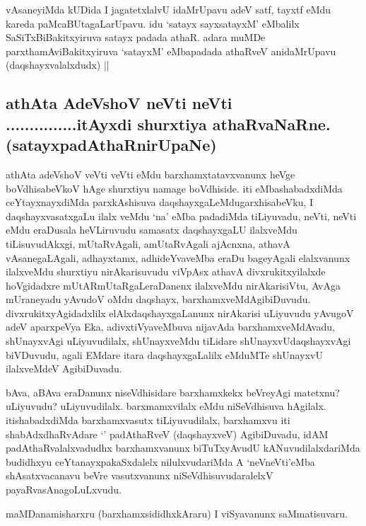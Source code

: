 \begin{artha}

vAsaneyiMda kUDida I jagatetxlalvU idaMrUpavu adeV satf, tayxtf eMdu
kareda paMcaBUtagaLarUpavu. idu `satayx sayxsatayxM' eMbalilx
SaSiTxBiBakitxyiruva satayx padada athaR. adara muMDe
parxthamAviBakitxyiruva `satayxM' eMbapadada athaRveV anidaMrUpavu
(daqshayxvalalxdudx) ||
\end{artha}

\begin{center}

\section*{athAta AdeVshoV neVti neVti ...............itAyxdi shurxtiya athaRvaNaRne.(satayxpadAthaRnirUpaNe)}

\bigskip


\end{center}

\begin{artha}
athAta adeVshoV veVti veVti eMdu barxhamxtatavxvanunx heVge
boVdhisabeVkoV hAge shurxtiyu namage boVdhiside. iti eMbashabadxdiMda
ceYtayxnayxdiMda parxkAshisuva daqshayxgaLeMdugarxhisabeVku, I
daqshayxvasatxgaLu ilalx veMdu `na' eMba padadiMda tiLiyuvadu, neVti,
neVti eMdu eraDusala heVLiruvudu samasatx daqshayxgaLU ilalxveMdu
tiLisuvudAkxgi, mUtaRvAgali, amUtaRvAgali ajAcnxna, athavA
vAsanegaLAgali, adhayxtamx, adhideYvaveMba eraDu bageyAgali
elalxvanunx ilalxveMdu shurxtiyu nirAkarisuvudu viVpAsx athavA
divxrukitxyilalxde hoVgidadxre mUtARmUtaRgaLeraDanenx ilalxveMdu
nirAkarisiVtu, AvAga mUraneyadu yAvudoV oMdu daqshayx,
barxhamxveMdAgibiDuvudu. divxrukitxyAgidadxlilx elAlxdaqshayxgaLanunx
nirAkarisi uLiyuvudu yAvugoV adeV aparxpeVya Eka, adivxtiVyaveMbuva
nijavAda barxhamxveMdAvadu, shUnayxvAgi uLiyuvudilalx, shUnayxveMdu
tiLidare shUnayxvUdaqshayxvAgi biVDuvudu, agali EMdare itara
daqshayxgaLalilx eMduMTe shUnayxvU ilalxveMdeV AgibiDuvadu.

bAva, aBAva eraDanunx niseVdhisidare barxhamxkekx beVreyAgi matetxnu?
uLiyuvudu? uLiyuvudilalx. barxmamxvilalx eMdu niSeVdhisuva
hAgilalx. itishabadxdiMda barxhamxvasutx tiLiyuvudilalx, barxhamxvu
iti shabAdxdhaRvAdare `\stext' padAthaRveV (daqshayxveV) AgibiDuvadu,
idAM padAthaRvalalxvadudhx barxhamxvanunx biTuTxyAvudU
kANuvudilalxdariMda budidhxyu ceYtanayxpakaSxdalelx nilulxvudariMda A
`neVneVti'eMba shAsatxvacanavu beVre vasutxvanunx
niSeVdhisuvudaralelxV payaRvasAnagoLuLxvudu.

maMDanamisharxru (barxhamxsididhxkAraru) I viSyavanunx
saMmatisuvaru. \stext 
\end{artha}

